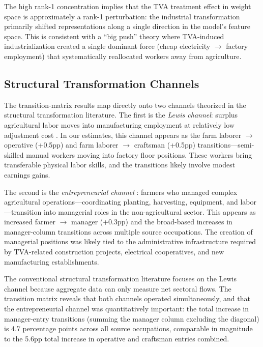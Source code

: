 \documentclass[12pt]{article}
\begin{document}
The high rank-1 concentration implies that the TVA treatment effect in weight space is approximately a rank-1 perturbation: the industrial transformation primarily shifted representations along a single direction in the model's feature space. This is consistent with a ``big push'' theory where TVA-induced industrialization created a single dominant force (cheap electricity $\to$ factory employment) that systematically reallocated workers away from agriculture.

\subsection{Structural Transformation Channels}

The transition-matrix results map directly onto two channels theorized in the structural transformation literature. The first is the \textit{Lewis channel}: surplus agricultural labor moves into manufacturing employment at relatively low adjustment cost \citep{lewis1954}. In our estimates, this channel appears as the farm laborer $\to$ operative (+0.5pp) and farm laborer $\to$ craftsman (+0.5pp) transitions---semi-skilled manual workers moving into factory floor positions. These workers bring transferable physical labor skills, and the transitions likely involve modest earnings gains.

The second is the \textit{entrepreneurial channel} \citep[cf.][]{gollin2014}: farmers who managed complex agricultural operations---coordinating planting, harvesting, equipment, and labor---transition into managerial roles in the non-agricultural sector. This appears as increased farmer $\to$ manager (+0.3pp) and the broad-based increases in manager-column transitions across multiple source occupations. The creation of managerial positions was likely tied to the administrative infrastructure required by TVA-related construction projects, electrical cooperatives, and new manufacturing establishments.

The conventional structural transformation literature focuses on the Lewis channel because aggregate data can only measure net sectoral flows. The transition matrix reveals that both channels operated simultaneously, and that the entrepreneurial channel was quantitatively important: the total increase in manager-entry transitions (summing the manager column excluding the diagonal) is 4.7 percentage points across all source occupations, comparable in magnitude to the 5.6pp total increase in operative and craftsman entries combined.
\end{document}
